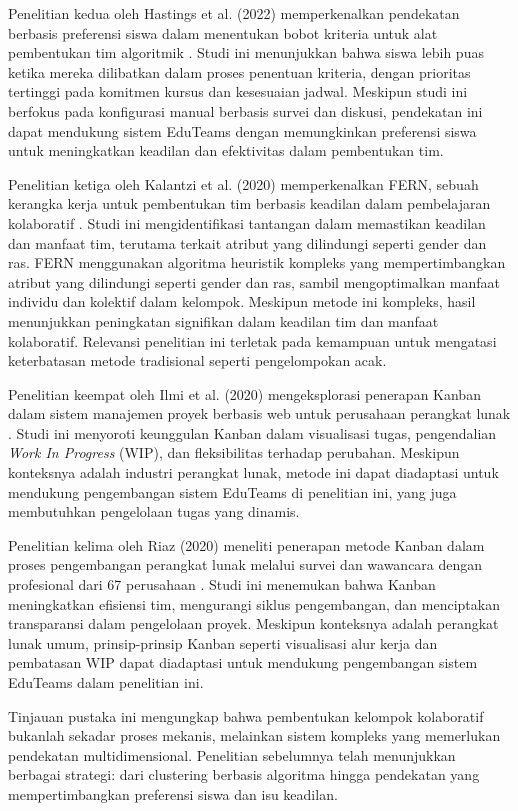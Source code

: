 Penelitian kedua oleh Hastings et al. (2022) memperkenalkan pendekatan berbasis preferensi siswa dalam menentukan bobot kriteria untuk alat pembentukan tim algoritmik \cite{Hastings2022}. Studi ini menunjukkan bahwa siswa lebih puas ketika mereka dilibatkan dalam proses penentuan kriteria, dengan prioritas tertinggi pada komitmen kursus dan kesesuaian jadwal. Meskipun studi ini berfokus pada konfigurasi manual berbasis survei dan diskusi, pendekatan ini dapat mendukung sistem EduTeams dengan memungkinkan preferensi siswa untuk meningkatkan keadilan dan efektivitas dalam pembentukan tim.

Penelitian ketiga oleh Kalantzi et al. (2020) memperkenalkan FERN, sebuah kerangka kerja untuk pembentukan tim berbasis keadilan dalam pembelajaran kolaboratif \cite{Kalantzi2020}. Studi ini mengidentifikasi tantangan dalam memastikan keadilan dan manfaat tim, terutama terkait atribut yang dilindungi seperti gender dan ras. FERN menggunakan algoritma heuristik kompleks yang mempertimbangkan atribut yang dilindungi seperti gender dan ras, sambil mengoptimalkan manfaat individu dan kolektif dalam kelompok. Meskipun metode ini kompleks, hasil menunjukkan peningkatan signifikan dalam keadilan tim dan manfaat kolaboratif. Relevansi penelitian ini terletak pada kemampuan untuk mengatasi keterbatasan metode tradisional seperti pengelompokan acak.

Penelitian keempat oleh Ilmi et al. (2020) mengeksplorasi penerapan Kanban dalam sistem manajemen proyek berbasis web untuk perusahaan perangkat lunak \cite{Ilmi2020}. Studi ini menyoroti keunggulan Kanban dalam visualisasi tugas, pengendalian \textit{Work In Progress} (WIP), dan fleksibilitas terhadap perubahan. Meskipun konteksnya adalah industri perangkat lunak, metode ini dapat diadaptasi untuk mendukung pengembangan sistem EduTeams di penelitian ini, yang juga membutuhkan pengelolaan tugas yang dinamis.

Penelitian kelima oleh Riaz (2020) meneliti penerapan metode Kanban dalam proses pengembangan perangkat lunak melalui survei dan wawancara dengan profesional dari 67 perusahaan \cite{Kanban2019}. Studi ini menemukan bahwa Kanban meningkatkan efisiensi tim, mengurangi siklus pengembangan, dan menciptakan transparansi dalam pengelolaan proyek. Meskipun konteksnya adalah perangkat lunak umum, prinsip-prinsip Kanban seperti visualisasi alur kerja dan pembatasan WIP dapat diadaptasi untuk mendukung pengembangan sistem EduTeams dalam penelitian ini.

Tinjauan pustaka ini mengungkap bahwa pembentukan kelompok kolaboratif bukanlah sekadar proses mekanis, melainkan sistem kompleks yang memerlukan pendekatan multidimensional. Penelitian sebelumnya telah menunjukkan berbagai strategi: dari clustering berbasis algoritma hingga pendekatan yang mempertimbangkan preferensi siswa dan isu keadilan.

